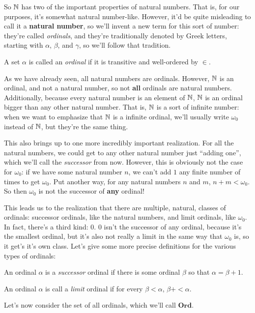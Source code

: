 So $\mathbb{N}$ has two of the important properties of natural numbers.
That is, for our purposes, it's somewhat natural number-like.
However, it'd be quite misleading to call it a \textbf{natural number}, so we'll invent a new term for this sort of number: they're called \emph{ordinals}, and they're traditionally denoted by Greek letters, starting with $\alpha$, $\beta$, and $\gamma$, so we'll follow that tradition.

\begin{definition}
    A set $\alpha$ is called an \emph{ordinal} if it is transitive and well-ordered by $\in$.
\end{definition}

As we have already seen, all natural numbers are ordinals.
However, $\mathbb{N}$ is an ordinal, and not a natural number, so not \textbf{all} ordinals are natural numbers.
Additionally, because every natural number is an element of $\mathbb{N}$, $\mathbb{N}$ is an ordinal bigger than any other natural number.
That is, $\mathbb{N}$ is a sort of infinite number: when we want to emphasize that $\mathbb{N}$ is a infinite ordinal, we'll usually write $\omega_0$ instead of $\mathbb{N}$, but they're the same thing.

This also brings up to one more incredibly important realization.
For all the natural numbers, we could get to any other natural number just ``adding one'', which we'll call the \emph{successor} from now.
However, this is obviously not the case for $\omega_0$: if we have some natural number $n$, we can't add $1$ any finite number of times to get $\omega_0$.
Put another way, for any natural numbers $n$ and $m$, $n + m < \omega_0$.
So then $\omega_0$ is not the successor of \textbf{any} ordinal!

This leads us to the realization that there are multiple, natural, classes of ordinals: successor ordinals, like the natural numbers, and limit ordinals, like $\omega_0$.
In fact, there's a third kind: $0$.
$0$ isn't the successor of any ordinal, because it's the smallest ordinal, but it's also not really a limit in the same way that $\omega_0$ is, so it get's it's own class.
Let's give some more precise definitions for the various types of ordinals:

\begin{definition}
    An ordinal $\alpha$ is a \emph{successor} ordinal if there is some ordinal $\beta$ so that $\alpha = \beta + 1$.
\end{definition}

\begin{definition}
    An ordinal $\alpha$ is call a \emph{limit} ordinal if for every $\beta < \alpha$, $\beta + < \alpha$.
\end{definition}


Let's now consider the set of all ordinals, which we'll call $\bm{Ord}$.

